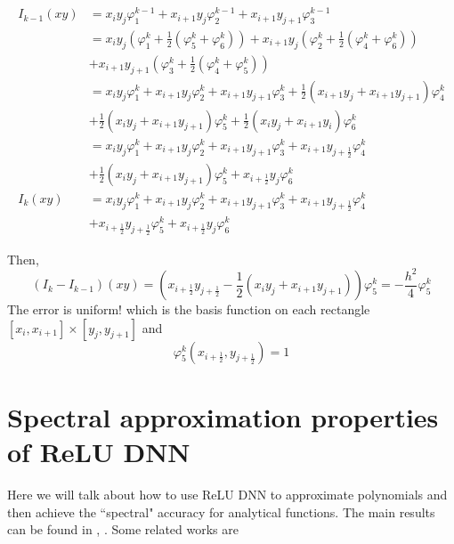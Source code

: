 \[
\begin{split}
I_{k-1}(xy) &= x_iy_j\varphi^{k-1}_1 + x_{i+1}y_j\varphi^{k-1}_2 + x_{i+1}y_{j+1}\varphi^{k-1}_3\\
&=x_iy_j(\varphi^k_1 + \frac{1}{2}(\varphi^k_5+\varphi^k_6)) + x_{i+1}y_j(\varphi^k_2 + \frac{1}{2}(\varphi^k_4+\varphi^k_6))\\
&+x_{i+1}y_{j+1}(\varphi^k_3+\frac{1}{2}(\varphi^k_4+\varphi^k_5))\\
&=x_iy_j\varphi^k_1 + x_{i+1}y_j\varphi^k_2+x_{i+1}y_{j+1}\varphi^k_3+\frac{1}{2}(x_{i+1}y_j+x_{i+1}y_{j+1})\varphi^k_4\\
&+\frac{1}{2}(x_{i}y_j+x_{i+1}y_{j+1})\varphi^k_5+\frac{1}{2}(x_{i}y_j+x_{i+1}y_{i})\varphi^k_6\\
&=x_iy_j\varphi^k_1 + x_{i+1}y_j\varphi^k_2+x_{i+1}y_{j+1}\varphi^k_3+x_{i+1}y_{j+\frac{1}{2}}\varphi^k_4\\
&+\frac{1}{2}(x_{i}y_j+x_{i+1}y_{j+1})\varphi^k_5+x_{i+\frac{1}{2}}y_j\varphi^k_6\\
I_k(xy) & = x_iy_j\varphi^k_1+x_{i+1}y_j\varphi^k_2+x_{i+1}y_{j+1}\varphi^k_3+x_{i+1}y_{j+\frac{1}{2}}\varphi^k_4 \\
&+x_{i+\frac{1}{2}}y_{j+\frac{1}{2}}\varphi^k_5 + x_{i+\frac{1}{2}}y_j\varphi^k_6
\end{split}
\]

Then,
\[
(I_k - I_{k-1})(xy) = (x_{i+\frac{1}{2}}y_{j+\frac{1}{2}}-\frac{1}{2}(x_{i}y_j+x_{i+1}y_{j+1}))\varphi^k_5 = -\frac{h^2}{4}\varphi_5^k
\]
The error is uniform! which is the basis function on each rectangle $[x_i,x_{i+1}]\times [y_j,y_{j+1}]$ and 
\[
\varphi_5^k(x_{i+\frac{1}{2}},y_{j+\frac{1}{2}}) = 1
\]


\section{Spectral approximation properties of ReLU DNN}
Here we will talk about how to use ReLU DNN to approximate polynomials
and then achieve the ``spectral" accuracy for analytical functions.
The main results can be found in \cite{yarotsky2017error},
\cite{wang2018exponential}. Some related works are
\cite{liang2016why,lu2017expressive}


